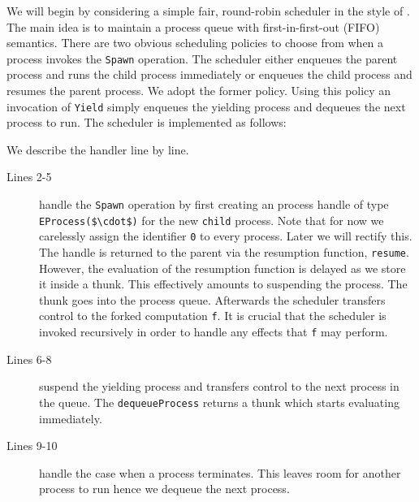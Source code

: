 \documentclass[12pt,mscres,cdtppar,twoside,openright,logo,rightchapter,normalheadings]{infthesis}
\theoremstyle{definition}
\begin{document}
We will begin by considering a simple fair, round-robin scheduler in
the style of \citet{Bauer2015}. The main idea is to maintain a process
queue with first-in-first-out (FIFO) semantics.  There are two obvious
scheduling policies to choose from when a process invokes the
\lstinline$Spawn$ operation. The scheduler either enqueues the parent
process and runs the child process immediately or enqueues the child
process and resumes the parent process. We adopt the former
policy. Using this policy an invocation of \lstinline$Yield$ simply
enqueues the yielding process and dequeues the next process to
run. The scheduler is implemented as follows:
%

%
We describe the handler line by line.
%
\begin{description}
\item[Lines 2-5] handle the \lstinline$Spawn$ operation by first
  creating an process handle of type
  \lstinline[mathescape]!EProcess($\cdot$)! for the new
  \lstinline$child$ process. Note that for now we carelessly assign
  the identifier \lstinline$0$ to every process. Later we will rectify
  this. The handle is returned to the parent via the resumption
  function, \lstinline$resume$. However, the evaluation of the
  resumption function is delayed as we store it inside a thunk.  This
  effectively amounts to suspending the process. The thunk goes into
  the process queue. Afterwards the scheduler transfers control to the
  forked computation \lstinline$f$. It is crucial that the scheduler
  is invoked recursively in order to handle any effects that
  \lstinline$f$ may perform.

\item[Lines 6-8] suspend the yielding process and transfers control to
  the next process in the queue. The \lstinline$dequeueProcess$
  returns a thunk which starts evaluating immediately.

\item[Lines 9-10] handle the case when a process terminates. This
  leaves room for another process to run hence we dequeue the next
  process.

\end{description}
%
\end{document}
